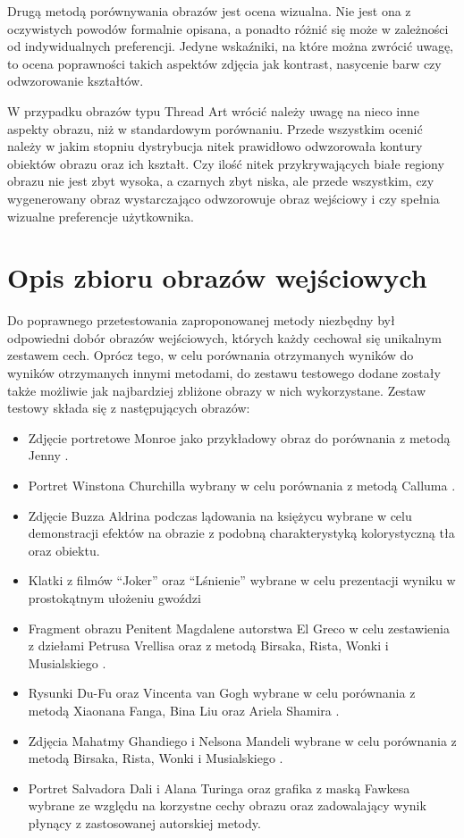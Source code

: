 \documentclass[a4paper, 12pt, polish, twoside]{extreport}
\begin{document}
    Drugą metodą porównywania obrazów jest ocena wizualna. Nie jest ona z oczywistych powodów formalnie opisana, a ponadto różnić się może w zależności od indywidualnych preferencji. Jedyne wskaźniki, na które można zwrócić uwagę, to ocena poprawności takich aspektów zdjęcia jak kontrast, nasycenie barw czy odwzorowanie kształtów.
    
    W przypadku obrazów typu Thread Art wrócić należy uwagę na nieco inne aspekty obrazu, niż w standardowym porównaniu. Przede wszystkim ocenić należy w jakim stopniu dystrybucja nitek prawidłowo odwzorowała kontury obiektów obrazu oraz ich kształt. Czy ilość nitek przykrywających białe regiony obrazu nie jest zbyt wysoka, a czarnych zbyt niska, ale przede wszystkim, czy wygenerowany obraz wystarczająco odwzorowuje obraz wejściowy i czy spełnia wizualne preferencje użytkownika.
    
    \section{Opis zbioru obrazów wejściowych} \label{comp-dataset}
    Do poprawnego przetestowania zaproponowanej metody niezbędny był odpowiedni dobór obrazów wejściowych, których każdy cechował się unikalnym zestawem cech. Oprócz tego, w celu porównania otrzymanych wyników do wyników otrzymanych innymi metodami, do zestawu testowego dodane zostały także możliwie jak najbardziej zbliżone obrazy w nich wykorzystane. Zestaw testowy składa się z następujących obrazów:
    \begin{itemize}
        \item Zdjęcie portretowe Monroe jako przykładowy obraz do porównania z metodą Jenny \cite{jenny-github}.
        \item Portret Winstona Churchilla wybrany w celu porównania z metodą Calluma \cite{callum-github}.
        \item Zdjęcie Buzza Aldrina podczas lądowania na księżycu wybrane w celu demonstracji efektów na obrazie z podobną charakterystyką kolorystyczną tła oraz obiektu.
        \item Klatki z filmów ``Joker'' oraz ``Lśnienie'' wybrane w celu prezentacji wyniku w prostokątnym ułożeniu gwoździ
        \item Fragment obrazu Penitent Magdalene autorstwa El Greco w celu zestawienia z dziełami Petrusa Vrellisa \cite{new-way-to-knit} oraz z metodą Birsaka, Rista, Wonki i Musialskiego \cite{article-string-art-birsak}.
        \item Rysunki Du-Fu oraz Vincenta van Gogh wybrane w celu porównania z metodą Xiaonana Fanga, Bina Liu oraz Ariela Shamira \cite{article-string-art-xiaonan}.
        \item Zdjęcia Mahatmy Ghandiego i Nelsona Mandeli wybrane w celu porównania z metodą Birsaka, Rista, Wonki i Musialskiego \cite{article-string-art-birsak}.
        \item Portret Salvadora Dali i Alana Turinga oraz grafika z maską Fawkesa wybrane ze względu na korzystne cechy obrazu oraz zadowalający wynik płynący z zastosowanej autorskiej metody.
    \end{itemize}
\end{document}
